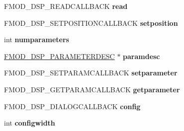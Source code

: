 \begin{DoxyCompactItemize}
\item 
\hypertarget{struct_f_m_o_d___d_s_p___d_e_s_c_r_i_p_t_i_o_n_a1c33b7154583cb5b1f650df7384f323f}{F\-M\-O\-D\-\_\-\-D\-S\-P\-\_\-\-R\-E\-A\-D\-C\-A\-L\-L\-B\-A\-C\-K {\bfseries read}}\label{struct_f_m_o_d___d_s_p___d_e_s_c_r_i_p_t_i_o_n_a1c33b7154583cb5b1f650df7384f323f}

\item 
\hypertarget{struct_f_m_o_d___d_s_p___d_e_s_c_r_i_p_t_i_o_n_a27a9b7951bdc37fe319b26c98222d9db}{F\-M\-O\-D\-\_\-\-D\-S\-P\-\_\-\-S\-E\-T\-P\-O\-S\-I\-T\-I\-O\-N\-C\-A\-L\-L\-B\-A\-C\-K {\bfseries setposition}}\label{struct_f_m_o_d___d_s_p___d_e_s_c_r_i_p_t_i_o_n_a27a9b7951bdc37fe319b26c98222d9db}

\item 
\hypertarget{struct_f_m_o_d___d_s_p___d_e_s_c_r_i_p_t_i_o_n_a6258ca66c8ed1583159b0a6d3bf05d68}{int {\bfseries numparameters}}\label{struct_f_m_o_d___d_s_p___d_e_s_c_r_i_p_t_i_o_n_a6258ca66c8ed1583159b0a6d3bf05d68}

\item 
\hypertarget{struct_f_m_o_d___d_s_p___d_e_s_c_r_i_p_t_i_o_n_a06e200c4e4316a4fd05649a4d14db422}{\hyperlink{struct_f_m_o_d___d_s_p___p_a_r_a_m_e_t_e_r_d_e_s_c}{F\-M\-O\-D\-\_\-\-D\-S\-P\-\_\-\-P\-A\-R\-A\-M\-E\-T\-E\-R\-D\-E\-S\-C} $\ast$ {\bfseries paramdesc}}\label{struct_f_m_o_d___d_s_p___d_e_s_c_r_i_p_t_i_o_n_a06e200c4e4316a4fd05649a4d14db422}

\item 
\hypertarget{struct_f_m_o_d___d_s_p___d_e_s_c_r_i_p_t_i_o_n_af8f88dcd36c8bedd7e675c99e43824a7}{F\-M\-O\-D\-\_\-\-D\-S\-P\-\_\-\-S\-E\-T\-P\-A\-R\-A\-M\-C\-A\-L\-L\-B\-A\-C\-K {\bfseries setparameter}}\label{struct_f_m_o_d___d_s_p___d_e_s_c_r_i_p_t_i_o_n_af8f88dcd36c8bedd7e675c99e43824a7}

\item 
\hypertarget{struct_f_m_o_d___d_s_p___d_e_s_c_r_i_p_t_i_o_n_a1cc169e951257f2d5fe5f7f31dd92011}{F\-M\-O\-D\-\_\-\-D\-S\-P\-\_\-\-G\-E\-T\-P\-A\-R\-A\-M\-C\-A\-L\-L\-B\-A\-C\-K {\bfseries getparameter}}\label{struct_f_m_o_d___d_s_p___d_e_s_c_r_i_p_t_i_o_n_a1cc169e951257f2d5fe5f7f31dd92011}

\item 
\hypertarget{struct_f_m_o_d___d_s_p___d_e_s_c_r_i_p_t_i_o_n_a9264d74f606ed0cf5f23a4633c30b3b6}{F\-M\-O\-D\-\_\-\-D\-S\-P\-\_\-\-D\-I\-A\-L\-O\-G\-C\-A\-L\-L\-B\-A\-C\-K {\bfseries config}}\label{struct_f_m_o_d___d_s_p___d_e_s_c_r_i_p_t_i_o_n_a9264d74f606ed0cf5f23a4633c30b3b6}

\item 
\hypertarget{struct_f_m_o_d___d_s_p___d_e_s_c_r_i_p_t_i_o_n_a245ac31fdb312449734f15ff8c03c0f0}{int {\bfseries configwidth}}\label{struct_f_m_o_d___d_s_p___d_e_s_c_r_i_p_t_i_o_n_a245ac31fdb312449734f15ff8c03c0f0}


\end{DoxyCompactItemize}
